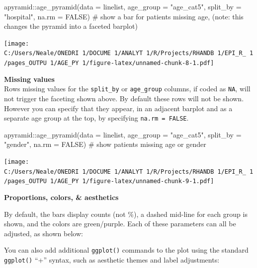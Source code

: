 \documentclass[
]{article}
\newenvironment{Shaded}{\begin{snugshade}}{\end{snugshade}}
\newcommand{\CommentTok}[1]{\textcolor[rgb]{0.50,0.62,0.50}{#1}}
\newcommand{\DataTypeTok}[1]{\textcolor[rgb]{0.87,0.87,0.75}{#1}}
\newcommand{\KeywordTok}[1]{\textcolor[rgb]{0.94,0.87,0.69}{#1}}
\newcommand{\NormalTok}[1]{\textcolor[rgb]{0.80,0.80,0.80}{#1}}
\newcommand{\OperatorTok}[1]{\textcolor[rgb]{0.94,0.94,0.82}{#1}}
\newcommand{\OtherTok}[1]{\textcolor[rgb]{0.94,0.94,0.56}{#1}}
\newcommand{\StringTok}[1]{\textcolor[rgb]{0.80,0.58,0.58}{#1}}
\begin{document}
\begin{Shaded}
\begin{Highlighting}[]
\NormalTok{apyramid}\OperatorTok{::}\KeywordTok{age\_pyramid}\NormalTok{(}\DataTypeTok{data =}\NormalTok{ linelist,}
                      \DataTypeTok{age\_group =} \StringTok{"age\_cat5"}\NormalTok{,}
                      \DataTypeTok{split\_by =} \StringTok{"hospital"}\NormalTok{,}
                      \DataTypeTok{na.rm =} \OtherTok{FALSE}\NormalTok{)        }\CommentTok{\# show a bar for patients missing age, (note: this changes the pyramid into a faceted barplot)}
\end{Highlighting}
\end{Shaded}

\texttt{[image: C:/Users/Neale/ONEDRI~1/DOCUME~1/ANALYT~1/R/Projects/RHANDB~1/EPI\_R\_~1/pages\_OUTPU~1/AGE\_PY~1/figure-latex/unnamed-chunk-8-1.pdf]}

\textbf{Missing values}\\
Rows missing values for the \texttt{split\_by} or \texttt{age\_group}
columns, if coded as \texttt{NA}, will not trigger the faceting shown
above. By default these rows will not be shown. However you can specify
that they appear, in an adjacent barplot and as a separate age group at
the top, by specifying \texttt{na.rm\ =\ FALSE}.

\begin{Shaded}
\begin{Highlighting}[]
\NormalTok{apyramid}\OperatorTok{::}\KeywordTok{age\_pyramid}\NormalTok{(}\DataTypeTok{data =}\NormalTok{ linelist,}
                      \DataTypeTok{age\_group =} \StringTok{"age\_cat5"}\NormalTok{,}
                      \DataTypeTok{split\_by =} \StringTok{"gender"}\NormalTok{,}
                      \DataTypeTok{na.rm =} \OtherTok{FALSE}\NormalTok{)         }\CommentTok{\# show patients missing age or gender}
\end{Highlighting}
\end{Shaded}

\texttt{[image: C:/Users/Neale/ONEDRI~1/DOCUME~1/ANALYT~1/R/Projects/RHANDB~1/EPI\_R\_~1/pages\_OUTPU~1/AGE\_PY~1/figure-latex/unnamed-chunk-9-1.pdf]}

\textbf{Proportions, colors, \& aesthetics}

By default, the bars display counts (not \%), a dashed mid-line for each
group is shown, and the colors are green/purple. Each of these
parameters can all be adjusted, as shown below:

You can also add additional \texttt{ggplot()} commands to the plot using
the standard \texttt{ggplot()} ``+'' syntax, such as aesthetic themes
and label adjustments:
\end{document}
